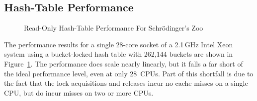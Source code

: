 \subsection{Hash-Table Performance}
\label{sec:datastruct:Hash-Table Performance}

\begin{figure}[tb]
\centering
{}
\caption{Read-Only Hash-Table Performance For Schr\"odinger's Zoo}
\label{fig:datastruct:Read-Only Hash-Table Performance For Schroedinger's Zoo}
\end{figure}

The performance results for a single 28-core socket of a 2.1\,GHz
Intel Xeon system using a bucket-locked hash table
with 262,144 buckets are shown in
Figure~\ref{fig:datastruct:Read-Only Hash-Table Performance For Schroedinger's Zoo}.
The performance does scale nearly linearly, but it falls a far short
of the ideal performance level, even at only 28~CPUs.
Part of this shortfall is due to the fact that the lock acquisitions and
releases incur no cache misses on a single CPU, but do incur misses
on two or more CPUs.

